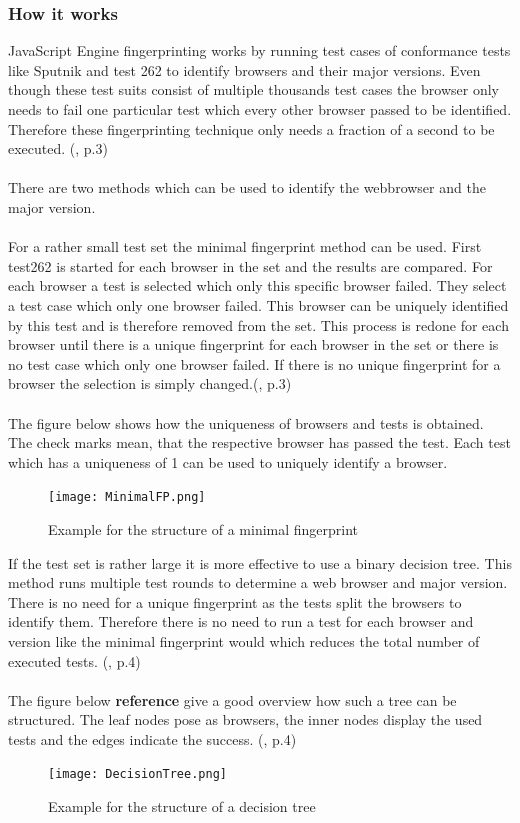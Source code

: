 \subsubsection{How it works}
JavaScript Engine fingerprinting works by running test cases of conformance tests like Sputnik and test 262 to identify browsers and their major versions. Even though these test suits consist of multiple thousands test cases the browser only needs to fail one particular test which every other browser passed to be identified. Therefore these fingerprinting technique only needs a fraction of a second to be executed. (\textcite{mulazzani13}, p.3) \\\\
There are two methods which can be used to identify the webbrowser and the major version.\\\\
For a rather small test set the minimal fingerprint method can be used. First test262 is started for each browser in the set and the results are compared. For each browser a test is selected which only this specific browser failed. They select a test case which only one browser failed. This browser can be uniquely identified by this test and is therefore removed from the set. This process is redone for each browser until there is a unique fingerprint for each browser in the set or there is no test case which only one browser failed. If there is no unique fingerprint for a browser the selection is simply changed.(\textcite{mulazzani13}, p.3)\\\\
The figure below shows how the uniqueness of browsers and tests is obtained. The check marks mean, that the respective browser has passed the test. Each test which has a uniqueness of 1 can be used to uniquely identify a browser.
\begin{figure}[H]
	\centering
	\texttt{[image: MinimalFP.png]}
	\caption{Example for the structure of a minimal fingerprint\\}
	\label{MinimalFP}
\end{figure}
If the test set is rather large it is more effective to use a binary decision tree. This method runs multiple test rounds to determine a web browser and major version. There is no need for a unique fingerprint as the tests split the browsers to identify them. Therefore there is no need to run a test for each browser and version like the  minimal fingerprint would which reduces the total number of executed tests. (\textcite{mulazzani13}, p.4)\\\\
The figure below \textbf{reference} give a good overview how such a tree can be structured. The leaf nodes pose as browsers, the inner nodes display the used tests and the edges indicate the success. (\textcite{mulazzani13}, p.4)
\begin{figure}[H]
	\centering
	\texttt{[image: DecisionTree.png]}
	\caption{Example for the structure of a decision tree}
	\label{DecisionTree}
\end{figure}

